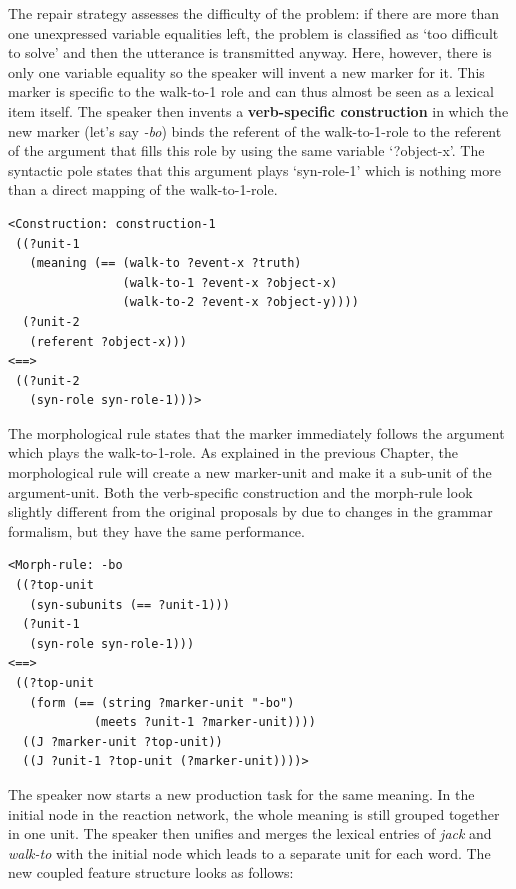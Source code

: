 The repair strategy assesses the difficulty of the problem: if there are more than one unexpressed variable equalities left, the problem is classified as `too difficult to solve' and then the utterance is transmitted anyway. Here, however, there is only one variable equality so the speaker will invent a new marker for it. This marker is specific to the walk-to-1 role and can thus almost be seen as a lexical item itself. The speaker then invents a {\bfseries verb-specific construction} in which the new marker (let's say {\em -bo}) binds the referent of the walk-to-1-role to the referent of the argument that fills this role by using the same variable `?object-x'. The syntactic pole states that this argument plays `syn-role-1' which is nothing more than a direct mapping of the walk-to-1-role.


\ea
\begin{lstlisting}
<Construction: construction-1
 ((?unit-1
   (meaning (== (walk-to ?event-x ?truth)
                (walk-to-1 ?event-x ?object-x)
                (walk-to-2 ?event-x ?object-y))))
  (?unit-2
   (referent ?object-x)))
<==>
 ((?unit-2
   (syn-role syn-role-1)))>
\end{lstlisting}
\z


The morphological rule states that the marker immediately follows the argument which plays the walk-to-1-role. As explained in the previous Chapter, the morphological rule will create a new marker-unit and make it a sub-unit of the argument-unit. Both the verb-specific construction and the morph-rule look slightly different from the original proposals by \citet{steels02simulating} due to changes in the grammar formalism, but they have the same performance.


\ea
\begin{lstlisting}
<Morph-rule: -bo
 ((?top-unit
   (syn-subunits (== ?unit-1)))
  (?unit-1
   (syn-role syn-role-1)))
<==>
 ((?top-unit
   (form (== (string ?marker-unit "-bo")
            (meets ?unit-1 ?marker-unit))))
  ((J ?marker-unit ?top-unit))
  ((J ?unit-1 ?top-unit (?marker-unit))))>
\end{lstlisting}
\z


The speaker now starts a new production task for the same meaning. In the initial node in the reaction network, the whole meaning is still grouped together in one unit. The speaker then unifies and merges the lexical entries of {\em jack} and {\em walk-to} with the initial node which leads to a separate unit for each word. The new coupled feature structure looks as follows:


